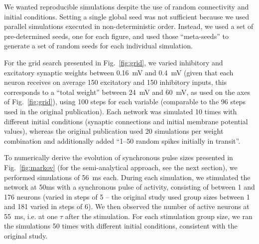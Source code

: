 \documentclass[10pt,a4paper,onecolumn]{article}
\begin{document}
We wanted reproducible simulations despite the use of random connectivity and initial conditions. Setting a single global seed was not sufficient because we used parallel simulations executed in non-deterministic order. Instead, we used a set of pre-determined seeds, one for each figure, and used those ``meta-seeds'' to generate a set of random seeds for each individual simulation.

For the grid search presented in Fig.~\ref{fig:grid}, we varied inhibitory and excitatory synaptic weights between \SI{0.16}{\milli\volt} and \SI{0.4}{\milli\volt} (given that each neuron receives on average 150 excitatory and 150 inhibitory inputs, this corresponds to a ``total weight'' between \SI{24}{\milli\volt} and \SI{60}{\milli\volt}, as used on the axes of Fig.~\ref{fig:grid}), using 100 steps for each variable (comparable to the 96 steps used in the original publication). Each network was simulated 10 times with different initial conditions (synaptic connections and initial membrane potential values), whereas the original publication used 20 simulations per weight combination and additionally added ``1--50 random spikes initially in transit''.

To numerically derive the evolution of synchronous pulse sizes presented in Fig.~\ref{fig:markov} (for the semi-analytical approach, see the next section), we performed simulations of \SI{56}{\milli\second} each. During each simulation, we stimulated the network at 50ms with a synchronous pulse of activity, consisting of between 1 and 176 neurons (varied in steps of 5 -- the original study used group sizes between 1 and 181 varied in steps of 6). We then observed the number of active neurons at \SI{55}{\milli\second}, i.e. at one $\tau$ after the stimulation. For each stimulation group size, we ran the simulations 50 times with different initial conditions, consistent with the original study.
\end{document}
